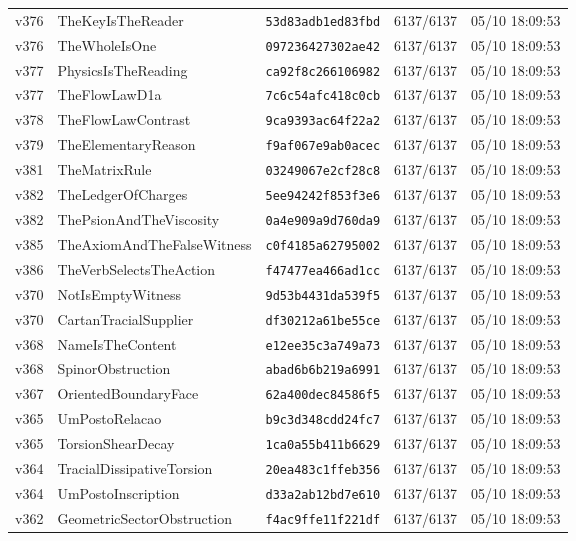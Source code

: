 \documentclass[11pt]{article}
\theoremstyle{definition}\newtheorem{deriv}{Derivation}
\begin{document}
{\begin{longtable}{@{}lllll@{}}
v376 & TheKeyIsTheReader & \texttt{53d83adb1ed83fbd} & 6137/6137 & 05/10 18:09:53 \\
v376 & TheWholeIsOne & \texttt{097236427302ae42} & 6137/6137 & 05/10 18:09:53 \\
v377 & PhysicsIsTheReading & \texttt{ca92f8c266106982} & 6137/6137 & 05/10 18:09:53 \\
v377 & TheFlowLawD1a & \texttt{7c6c54afc418c0cb} & 6137/6137 & 05/10 18:09:53 \\
v378 & TheFlowLawContrast & \texttt{9ca9393ac64f22a2} & 6137/6137 & 05/10 18:09:53 \\
v379 & TheElementaryReason & \texttt{f9af067e9ab0acec} & 6137/6137 & 05/10 18:09:53 \\
v381 & TheMatrixRule & \texttt{03249067e2cf28c8} & 6137/6137 & 05/10 18:09:53 \\
v382 & TheLedgerOfCharges & \texttt{5ee94242f853f3e6} & 6137/6137 & 05/10 18:09:53 \\
v382 & ThePsionAndTheViscosity & \texttt{0a4e909a9d760da9} & 6137/6137 & 05/10 18:09:53 \\
v385 & TheAxiomAndTheFalseWitness & \texttt{c0f4185a62795002} & 6137/6137 & 05/10 18:09:53 \\
v386 & TheVerbSelectsTheAction & \texttt{f47477ea466ad1cc} & 6137/6137 & 05/10 18:09:53 \\
v370 & NotIsEmptyWitness & \texttt{9d53b4431da539f5} & 6137/6137 & 05/10 18:09:53 \\
v370 & CartanTracialSupplier & \texttt{df30212a61be55ce} & 6137/6137 & 05/10 18:09:53 \\
v368 & NameIsTheContent & \texttt{e12ee35c3a749a73} & 6137/6137 & 05/10 18:09:53 \\
v368 & SpinorObstruction & \texttt{abad6b6b219a6991} & 6137/6137 & 05/10 18:09:53 \\
v367 & OrientedBoundaryFace & \texttt{62a400dec84586f5} & 6137/6137 & 05/10 18:09:53 \\
v365 & UmPostoRelacao & \texttt{b9c3d348cdd24fc7} & 6137/6137 & 05/10 18:09:53 \\
v365 & TorsionShearDecay & \texttt{1ca0a55b411b6629} & 6137/6137 & 05/10 18:09:53 \\
v364 & TracialDissipativeTorsion & \texttt{20ea483c1ffeb356} & 6137/6137 & 05/10 18:09:53 \\
v364 & UmPostoInscription & \texttt{d33a2ab12bd7e610} & 6137/6137 & 05/10 18:09:53 \\
v362 & GeometricSectorObstruction & \texttt{f4ac9ffe11f221df} & 6137/6137 & 05/10 18:09:53 \\

\end{longtable}}
\end{document}
